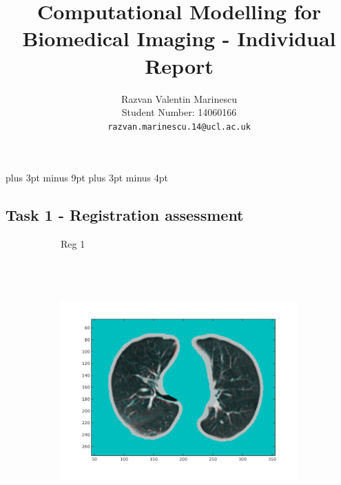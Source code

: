 \documentclass[11pt,a4paper,oneside]{report}
\title{Computational Modelling for Biomedical Imaging - Individual Report}
\author{
Razvan Valentin Marinescu\\
Student Number: 14060166\\
\texttt{razvan.marinescu.14@ucl.ac.uk}
}
\begin{document}
\belowdisplayskip=12pt plus 3pt minus 9pt
\belowdisplayshortskip=7pt plus 3pt minus 4pt
\maketitle{}




\subsection*{Task 1 - Registration assessment}

\begin{figure}[H]
  \centering
  \begin{subfigure}[b]{0.1\textwidth}
    Reg 1\\\\\\\\
  \end{subfigure}%
  \hspace*{-1.9em}
  \begin{subfigure}[b]{0.3\textwidth}
	  \includegraphics[width=\textwidth, trim=20 20 20 20]{figures/reg1/reg1_1_66.png}
  \end{subfigure}%
  \begin{subfigure}[b]{0.3\textwidth}

\end{subfigure}
\end{figure}
\end{document}
